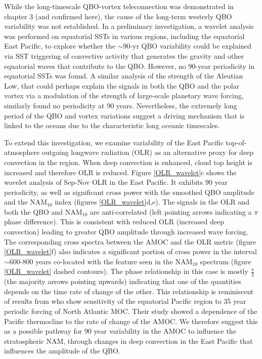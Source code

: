 While the long-timescale QBO-vortex teleconnection was demonstrated in chapter 3 (and confirmed here), the cause of the long-term westerly QBO variability was not established. In a preliminary investigation, a wavelet analysis was performed on equatorial SSTs in various regions, including the equatorial East Pacific, to explore whether the $\sim$90-yr QBO variability could be explained via SST triggering of  convective activity that generates the gravity and other equatorial waves that contribute to the QBO. However, no 90-year periodicity in equatorial SSTs was found. A similar analysis of the strength of the Aleutian Low, that could perhaps explain the signals in both the QBO and the polar vortex via a modulation of the strength of large-scale planetary wave forcing, similarly found no periodicity at 90 years. Nevertheless, the extremely long period of the QBO and vortex variations suggest a driving mechanism that is linked to the oceans due to the characteristic long oceanic timescales. 

To extend this investigation, we examine variability of the East Pacific top-of-atmosphere outgoing longwave radiation (OLR) as an alternative proxy for deep convection in the region. When deep convection is enhanced, cloud top height is increased and therefore OLR is reduced. Figure \ref{OLR_wavelet}c shows the wavelet analysis of Sep-Nov  OLR in the East Pacific. It exhibits 90 year periodicity, as well as significant cross power with the smoothed QBO amplitude and the NAM$_{10}$ index (figures \ref{OLR_wavelet}d,e). The signals in the OLR and both the QBO and NAM$_{10}$ are anti-correlated (left pointing arrows indicating a $\pi$ phase difference). This is consistent with reduced OLR (increased deep convection) leading to greater QBO amplitude through increased wave forcing.  The corresponding cross spectra between the AMOC and the OLR metric (figure \ref{OLR_wavelet}f) also indicates a significant portion of cross power in the interval $\sim$600-800 years co-located with the feature seen in the NAM$_{10}$ spectrum (figure \ref{OLR_wavelet} dashed contours). The phase relationship in this case is mostly $\frac{\pi}{2}$ (the majority arrows pointing upwards) indicating that one of the quantities depends on the time rate of change of the other. This relationship is reminiscent of results from \cite{timmermannENSO2005} who show sensitivity of the equatorial Pacific region to 35 year periodic forcing of North Atlantic MOC. Their study showed a dependence of the Pacific thermocline to the rate of change of the AMOC. We therefore suggest this as a possible pathway for 90 year variability in the AMOC to influence the stratospheric NAM, through changes in deep convection in the East Pacific that influences the amplitude of the QBO. 


